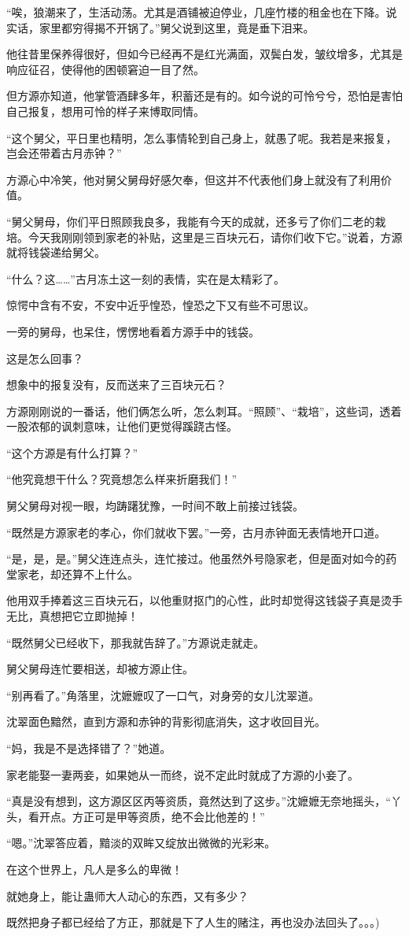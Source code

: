 \begin{this_body}
“唉，狼潮来了，生活动荡。尤其是酒铺被迫停业，几座竹楼的租金也在下降。说实话，家里都穷得揭不开锅了。”舅父说到这里，竟是垂下泪来。

他往昔里保养得很好，但如今已经再不是红光满面，双鬓白发，皱纹增多，尤其是响应征召，使得他的困顿窘迫一目了然。

但方源亦知道，他掌管酒肆多年，积蓄还是有的。如今说的可怜兮兮，恐怕是害怕自己报复，想用可怜的样子来博取同情。

“这个舅父，平日里也精明，怎么事情轮到自己身上，就愚了呢。我若是来报复，岂会还带着古月赤钟？”

方源心中冷笑，他对舅父舅母好感欠奉，但这并不代表他们身上就没有了利用价值。

“舅父舅母，你们平日照顾我良多，我能有今天的成就，还多亏了你们二老的栽培。今天我刚刚领到家老的补贴，这里是三百块元石，请你们收下它。”说着，方源就将钱袋递给舅父。

“什么？这……”古月冻土这一刻的表情，实在是太精彩了。

惊愕中含有不安，不安中近乎惶恐，惶恐之下又有些不可思议。

一旁的舅母，也呆住，愣愣地看着方源手中的钱袋。

这是怎么回事？

想象中的报复没有，反而送来了三百块元石？

方源刚刚说的一番话，他们俩怎么听，怎么刺耳。“照顾”、“栽培”，这些词，透着一股浓郁的讽刺意味，让他们更觉得蹊跷古怪。

“这个方源是有什么打算？”

“他究竟想干什么？究竟想怎么样来折磨我们！”

舅父舅母对视一眼，均踌躇犹豫，一时间不敢上前接过钱袋。

“既然是方源家老的孝心，你们就收下罢。”一旁，古月赤钟面无表情地开口道。

“是，是，是。”舅父连连点头，连忙接过。他虽然外号隐家老，但是面对如今的药堂家老，却还算不上什么。

他用双手捧着这三百块元石，以他重财抠门的心性，此时却觉得这钱袋子真是烫手无比，真想把它立即抛掉！

“既然舅父已经收下，那我就告辞了。”方源说走就走。

舅父舅母连忙要相送，却被方源止住。

“别再看了。”角落里，沈嬷嬷叹了一口气，对身旁的女儿沈翠道。

沈翠面色黯然，直到方源和赤钟的背影彻底消失，这才收回目光。

“妈，我是不是选择错了？”她道。

家老能娶一妻两妾，如果她从一而终，说不定此时就成了方源的小妾了。

“真是没有想到，这方源区区丙等资质，竟然达到了这步。”沈嬷嬷无奈地摇头，“丫头，看开点。方正可是甲等资质，绝不会比他差的！”

“嗯。”沈翠答应着，黯淡的双眸又绽放出微微的光彩来。

在这个世界上，凡人是多么的卑微！

就她身上，能让蛊师大人动心的东西，又有多少？

既然把身子都已经给了方正，那就是下了人生的赌注，再也没办法回头了。。。)

\end{this_body}

